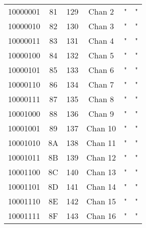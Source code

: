 \begin{center}
\begin{supertabular}{| c | c | c | c | c | c |}
                10000001 & 81 & 129 & Chan 2   &                   "                    &                    "                       \\
             10000010 & 82 & 130 & Chan 3   &                   "                    &                    "                       \\
                10000011 & 83 & 131 & Chan 4   &                   "                    &                    "                       \\
             10000100 & 84 & 132 & Chan 5   &                   "                    &                    "                       \\
                10000101 & 85 & 133 & Chan 6   &                   "                    &                    "                       \\
             10000110 & 86 & 134 & Chan 7   &                   "                    &                    "                       \\
                10000111 & 87 & 135 & Chan 8   &                   "                    &                    "                       \\
             10001000 & 88 & 136 & Chan 9   &                   "                    &                    "                       \\
                10001001 & 89 & 137 & Chan 10  &                   "                    &                    "                       \\
             10001010 & 8A & 138 & Chan 11  &                   "                    &                    "                       \\
                10001011 & 8B & 139 & Chan 12  &                   "                    &                    "                       \\
             10001100 & 8C & 140 & Chan 13  &                   "                    &                    "                       \\
                10001101 & 8D & 141 & Chan 14  &                   "                    &                    "                       \\
             10001110 & 8E & 142 & Chan 15  &                   "                    &                    "                       \\
                10001111 & 8F & 143 & Chan 16  &                   "                    &                    "                       \\
        \end{supertabular}
        \end{center}

